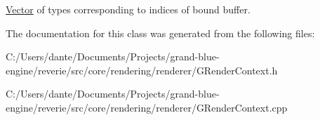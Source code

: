 \mbox{\hyperlink{classrev_1_1_vector}{Vector}} of types corresponding to indices of bound buffer. 



The documentation for this class was generated from the following files\+:\begin{DoxyCompactItemize}
\item 
C\+:/\+Users/dante/\+Documents/\+Projects/grand-\/blue-\/engine/reverie/src/core/rendering/renderer/G\+Render\+Context.\+h\item 
C\+:/\+Users/dante/\+Documents/\+Projects/grand-\/blue-\/engine/reverie/src/core/rendering/renderer/G\+Render\+Context.\+cpp\end{DoxyCompactItemize}
